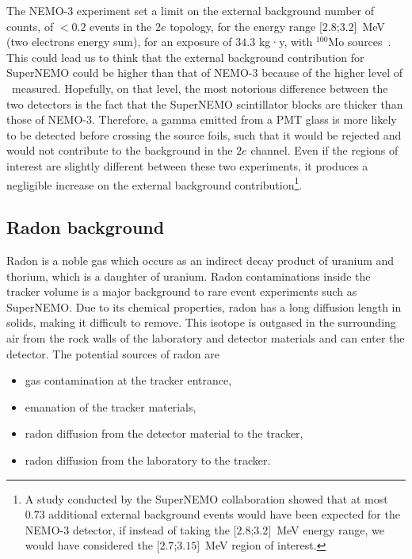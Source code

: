 The NEMO-$3$ experiment set a limit on the external background number of counts, of $<0.2$ events in the $2e$ topology, for the energy range [$2.8$;$3.2$]~MeV (two electrons energy sum), for an exposure of $34.3$ kg·y, with $^{100}$Mo sources~\cite{art:NEMO2015}.
This could lead us to think that the external background contribution for SuperNEMO could be higher than that of NEMO-$3$ because of the higher level of \Tl\ measured.
Hopefully, on that level, the most notorious difference between the two detectors is the fact that the SuperNEMO scintillator blocks are thicker than those of NEMO-$3$.
Therefore, a gamma emitted from a PMT glass is more likely to be detected before crossing the source foils, such that it would be rejected and would not contribute to the background in the $2e$ channel.
Even if the regions of interest are slightly different between these two experiments, it produces a negligible increase on the external background contribution\footnote{A study conducted by the SuperNEMO collaboration showed that at most $0.73$ additional external background events would have been expected for the NEMO-$3$ detector, if instead of taking the [$2.8$;$3.2$]~MeV energy range, we would have considered the [$2.7$;$3.15$]~MeV region of interest.}.%


\subsection{Radon background}

Radon is a noble gas which occurs as an indirect decay product of uranium and thorium, which is a daughter of uranium.
Radon contaminations inside the tracker volume is a major background to rare event experiments such as SuperNEMO.
Due to its chemical properties, radon has a long diffusion length in solids, making it difficult to remove.
This isotope is outgased in the surrounding air from the rock walls of the laboratory and detector materials and can enter the detector.
The potential sources of radon are
\begin{itemize}
\item gas contamination at the tracker entrance,
\item emanation of the tracker materials,
\item radon diffusion from the detector material to the tracker,
\item radon diffusion from the laboratory to the tracker.
\end{itemize}

